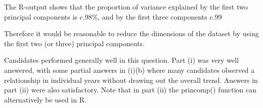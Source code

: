 \documentclass[a4paper,12pt]{article}
\begin{document}
The R-output shows that the proportion of variance explained by the first two principal
components is c.98\%, and by the first three components c.99%

Therefore it would be reasonable to reduce the dimensions of the dataset by using the
first two (or three) principal components.

\newpage 
Candidates performed generally well in this question. Part (i) was very well answered,
with some partial answers in (i)(b) where many candidates observed a relationship in
individual years without drawing out the overall trend. Answers in part (ii) were also
satisfactory. Note that in part (ii) the princomp() function can alternatively be used in R.
\end{document}
